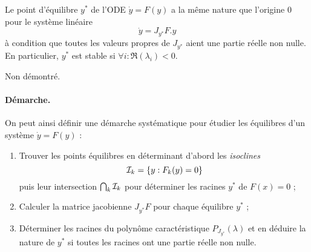 \begin{theorem}
  Le point d'équilibre $y^*$ de l'ODE $\dot y = F(y)$ a la même nature que l'origine $0$ pour le système linéaire 
  $$
  \dot y = J_{y^*}F . y
  $$
  à condition que toutes les valeurs propres de $J_{y^*}$ aient une partie réelle non nulle. \\
  En particulier, $y^*$ est stable si $\forall i: \Re(\lambda_i) < 0$.
\end{theorem}

\proof Non démontré. \eproof

\paragraph*{Démarche.}
On peut ainsi définir une démarche systématique pour étudier les équilibres d'un système $\dot y = F(y)$ :
\begin{enumerate}
  \item Trouver les points équilibres en déterminant d'abord les {\em isoclines}
  $$
  \mathcal{I}_k = \{y : F_k(y) = 0\}
  $$
  puis leur intersection $\bigcap_k \mathcal{I}_k$ pour déterminer les racines $y^*$ de  $F(x) = 0$ ;
  \item Calculer la matrice jacobienne $J_{y^*} F$ pour chaque équilibre $y^*$ ;
  \item Déterminer les racines du polynôme caractéristique $P_{J_{y^*}}(\lambda)$ et en déduire la nature de $y^*$ si toutes les racines ont une partie réelle non nulle.
\end{enumerate}


